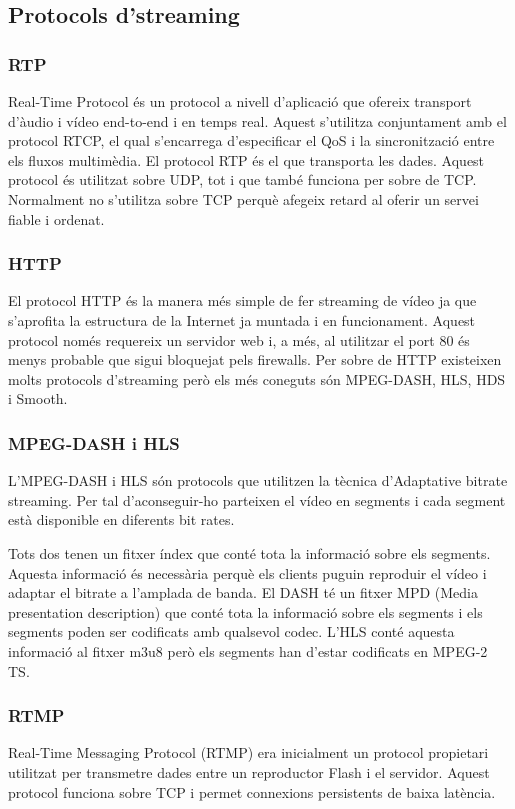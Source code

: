 \documentclass[12pt, titlepage]{article}
\begin{document}
\subsection{Protocols d’streaming}

\subsubsection{RTP}
Real-Time Protocol és un protocol a nivell d’aplicació que ofereix transport
d'àudio i vídeo end-to-end i en temps real. Aquest s’utilitza conjuntament amb
el protocol RTCP, el qual s’encarrega d’especificar el QoS i la sincronització
entre els fluxos multimèdia. El protocol RTP és el que transporta les dades.
Aquest protocol és utilitzat sobre UDP, tot i que també funciona per sobre de
TCP. Normalment no s’utilitza sobre TCP perquè afegeix retard al oferir un servei
fiable i ordenat.

\subsubsection{HTTP}
El protocol HTTP és la manera més simple de fer streaming de vídeo ja que
s’aprofita la estructura de la Internet ja muntada i en funcionament. Aquest
protocol només requereix un servidor web i, a més, al utilitzar el port 80 és
menys probable que sigui bloquejat pels firewalls. Per sobre de HTTP existeixen
molts protocols d’streaming però els més coneguts són MPEG-DASH, HLS, HDS i Smooth.

\subsubsection{MPEG-DASH i HLS}
L'MPEG-DASH i HLS són protocols que utilitzen la tècnica d'Adaptative bitrate streaming.
Per tal d'aconseguir-ho parteixen el vídeo en segments i cada segment està
disponible en diferents bit rates.

Tots dos tenen un fitxer índex que conté tota la informació sobre els segments. Aquesta
informació és necessària perquè els clients puguin reproduir el vídeo i adaptar el bitrate
a l'amplada de banda. El DASH té un fitxer MPD (Media presentation
description) que conté tota la informació sobre els segments i els segments poden
ser codificats amb qualsevol codec. L'HLS conté aquesta informació al fitxer m3u8 però
els segments han d'estar codificats en MPEG-2 TS.

\subsubsection{RTMP}
Real-Time Messaging Protocol (RTMP) era inicialment un protocol propietari utilitzat
per transmetre dades entre un reproductor Flash i el servidor. Aquest protocol
funciona sobre TCP i permet connexions persistents de baixa latència.
\end{document}
